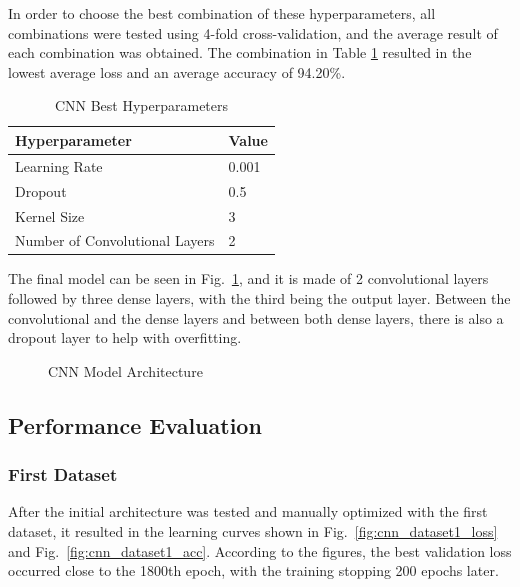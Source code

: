 In order to choose the best combination of these hyperparameters, all combinations were tested using 4-fold cross-validation, and the average result of each combination was obtained. The combination in Table \ref{table:cnn_best_hyperparameters} resulted in the lowest average loss and an average accuracy of 94.20\%.

\begin{table}[H]
    \centering
    \caption{CNN Best Hyperparameters}
    \label{table:cnn_best_hyperparameters}
    \begin{tabular}{|l|l|}
        \hline
        Hyperparameter & Value \\
        \hline
        Learning Rate & 0.001 \\
        \hline
        Dropout & 0.5 \\
        \hline
        Kernel Size & 3 \\
        \hline
        Number of Convolutional Layers & 2 \\
        \hline
    \end{tabular}
\end{table}

The final model can be seen in Fig.~\ref{fig:cnn_architecture}, and it is made of 2 convolutional layers followed by three dense layers, with the third being the output layer. Between the convolutional and the dense layers and between both dense layers, there is also a dropout layer to help with overfitting.

\begin{figure}[H]
    \centering
    {\fontsize{10}{12}\selectfont}
    \caption[CNN Model Architecture]{CNN Model Architecture}
    \label{fig:cnn_architecture}
\end{figure}

\subsection{Performance Evaluation}

\subsubsection{First Dataset}

After the initial architecture was tested and manually optimized with the first dataset, it resulted in the learning curves shown in Fig.~\ref{fig:cnn_dataset1_loss} and Fig.~\ref{fig:cnn_dataset1_acc}. According to the figures, the best validation loss occurred close to the 1800th epoch, with the training stopping 200 epochs later.

